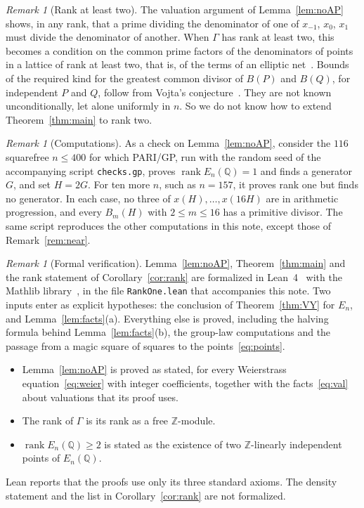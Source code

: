 \documentclass[11pt]{amsart}
\theoremstyle{definition}
\theoremstyle{remark}
\newtheorem{remark}[theorem]{Remark}
\newcommand{\Q}{\mathbb{Q}}
\newcommand{\Z}{\mathbb{Z}}
\DeclareMathOperator{\rk}{rank}
\begin{document}
\begin{remark}[Rank at least two]
The valuation argument of Lemma~\ref{lem:noAP} shows, in any rank, that a prime dividing the denominator
of one of $x_{-1}$, $x_0$, $x_1$ must divide the denominator of another. When $\Gamma$ has rank at least two,
this becomes a condition on the common prime factors of the denominators of points in a lattice of rank
at least two, that is, of the terms of an elliptic net~\cite{Stange}. Bounds of the required kind for the
greatest common divisor of $B(P)$ and $B(Q)$, for independent $P$ and $Q$, follow from Vojta's
conjecture~\cite{Si05}. They are not known unconditionally, let alone uniformly in $n$. So we do not
know how to extend Theorem~\ref{thm:main} to rank two.
\end{remark}

\begin{remark}[Computations]
As a check on Lemma~\ref{lem:noAP}, consider the $116$ squarefree $n\le400$ for which PARI/GP, run with
the random seed of the accompanying script \texttt{checks.gp}, proves $\rk E_n(\Q)=1$ and finds a
generator $G$, and set $H=2G$. For ten more $n$, such as $n=157$, it proves rank one but finds no
generator. In each case, no three of $x(H),\dots,x(16H)$ are in arithmetic progression, and every $B_m(H)$
with $2\le m\le16$ has a primitive divisor. The same script reproduces the other computations in this
note, except those of Remark~\ref{rem:near}.
\end{remark}

\begin{remark}[Formal verification]\label{rem:lean}
Lemma~\ref{lem:noAP}, Theorem~\ref{thm:main} and the rank statement of Corollary~\ref{cor:rank} are
formalized in Lean~4~\cite{Lean} with the Mathlib library~\cite{Mathlib}, in the file
\texttt{RankOne.lean} that accompanies this note. Two inputs enter as explicit hypotheses: the conclusion of
Theorem~\ref{thm:VY} for $E_n$, and Lemma~\ref{lem:facts}(a). Everything else is proved, including the
halving formula behind Lemma~\ref{lem:facts}(b), the group-law computations and the passage from a magic
square of squares to the points~\eqref{eq:points}.
\begin{itemize}
\item Lemma~\ref{lem:noAP} is proved as stated, for every Weierstrass equation~\eqref{eq:weier} with
integer coefficients, together with the facts~\eqref{eq:val} about valuations that its proof uses.
\item The rank of $\Gamma$ is its rank as a free $\Z$-module.
\item $\rk E_n(\Q)\ge2$ is stated as the existence of two $\Z$-linearly independent points of $E_n(\Q)$.
\end{itemize}
Lean reports that the proofs use only its three standard axioms. The density statement and the list in
Corollary~\ref{cor:rank} are not formalized.
\end{remark}
\end{document}
